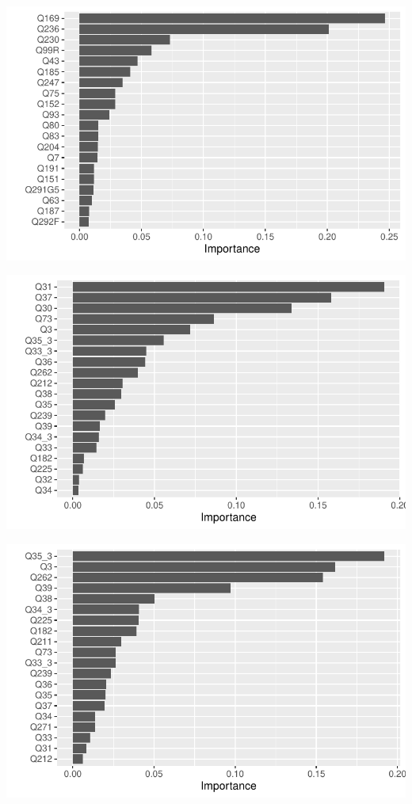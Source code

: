 \documentclass[
  letterpaper,
  DIV=11,
  numbers=noendperiod]{scrartcl}
\begin{document}
\includegraphics{Episode_2_files/figure-pdf/vip-2.pdf}

\includegraphics{Episode_2_files/figure-pdf/vip-3.pdf}

\includegraphics{Episode_2_files/figure-pdf/vip-4.pdf}
\end{document}
